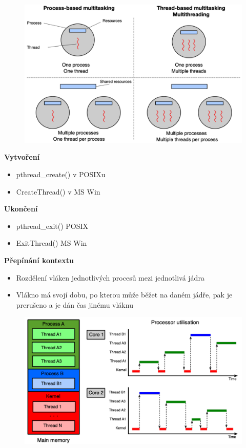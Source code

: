 \documentclass{szzclass}
\begin{document}
\begin{figure}[h]
    \includegraphics[width=.8\textwidth, center]{topics/bi-spol-16/images/multitask.png}
\end{figure}

\textbf{Vytvoření}
\begin{itemize}
    \item pthread\_create() v POSIXu
    \item CreateThread() v MS Win
\end{itemize}

\textbf{Ukončení}
\begin{itemize}
    \item pthread\_exit() POSIX
    \item ExitThread() MS Win
\end{itemize}

\newpage

\textbf{Přepínání kontextu}
\begin{itemize}
    \item Rozdělení vláken jednotlivých procesů mezi jednotlivá jádra
    \item Vlákno má svojí dobu, po kterou může běžet na daném jádře, pak je prerušeno a je dán čas jinému vláknu
\end{itemize}

\begin{figure}[h]
    \includegraphics[width=.8\textwidth, center]{topics/bi-spol-16/images/thread1.png}
\end{figure}
\end{document}
